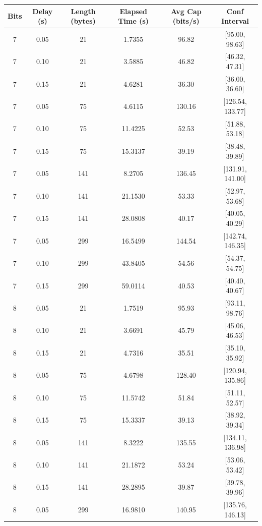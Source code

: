 \documentclass[10pt,a4paper]{article}
\begin{document}
\begin{table}[H]
    \centering
    \begin{tabular}{|c|c|c|c|c|c|}
    \hline
    \textbf{Bits} & \textbf{Delay (s)} & \textbf{Length (bytes)} & \textbf{Elapsed Time (s)} & \textbf{Avg Cap (bits/s)} & \textbf{Conf Interval} \\ \hline
    7 & 0.05 & 21 & 1.7355 & 96.82 & [95.00, 98.63] \\ \hline
    7 & 0.10 & 21 & 3.5885 & 46.82 & [46.32, 47.31] \\ \hline
    7 & 0.15 & 21 & 4.6281 & 36.30 & [36.00, 36.60] \\ \hline
    7 & 0.05 & 75 & 4.6115 & 130.16 & [126.54, 133.77] \\ \hline
    7 & 0.10 & 75 & 11.4225 & 52.53 & [51.88, 53.18] \\ \hline
    7 & 0.15 & 75 & 15.3137 & 39.19 & [38.48, 39.89] \\ \hline
    7 & 0.05 & 141 & 8.2705 & 136.45 & [131.91, 141.00] \\ \hline
    7 & 0.10 & 141 & 21.1530 & 53.33 & [52.97, 53.68] \\ \hline
    7 & 0.15 & 141 & 28.0808 & 40.17 & [40.05, 40.29] \\ \hline
    7 & 0.05 & 299 & 16.5499 & 144.54 & [142.74, 146.35] \\ \hline
    7 & 0.10 & 299 & 43.8405 & 54.56 & [54.37, 54.75] \\ \hline
    7 & 0.15 & 299 & 59.0114 & 40.53 & [40.40, 40.67] \\ \hline
    8 & 0.05 & 21 & 1.7519 & 95.93 & [93.11, 98.76] \\ \hline
    8 & 0.10 & 21 & 3.6691 & 45.79 & [45.06, 46.53] \\ \hline
    8 & 0.15 & 21 & 4.7316 & 35.51 & [35.10, 35.92] \\ \hline
    8 & 0.05 & 75 & 4.6798 & 128.40 & [120.94, 135.86] \\ \hline
    8 & 0.10 & 75 & 11.5742 & 51.84 & [51.11, 52.57] \\ \hline
    8 & 0.15 & 75 & 15.3337 & 39.13 & [38.92, 39.34] \\ \hline
    8 & 0.05 & 141 & 8.3222 & 135.55 & [134.11, 136.98] \\ \hline
    8 & 0.10 & 141 & 21.1872 & 53.24 & [53.06, 53.42] \\ \hline
    8 & 0.15 & 141 & 28.2895 & 39.87 & [39.78, 39.96] \\ \hline
    8 & 0.05 & 299 & 16.9810 & 140.95 & [135.76, 146.13] \\ \hline

\end{tabular}
\end{table}
\end{document}
